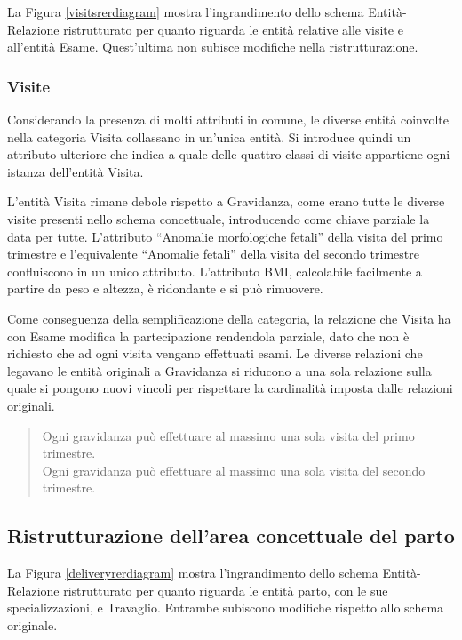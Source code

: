 La Figura \ref{visitsrerdiagram} mostra l'ingrandimento dello schema Entità-Relazione ristrutturato per quanto riguarda le entità relative alle visite e all'entità Esame.
Quest'ultima non subisce modifiche nella ristrutturazione.

\subsubsection{Visite}

Considerando la presenza di molti attributi in comune, le diverse entità coinvolte nella categoria Visita collassano in un'unica entità.
Si introduce quindi un attributo ulteriore che indica a quale delle quattro classi di visite appartiene ogni istanza dell'entità Visita.

L'entità Visita rimane debole rispetto a Gravidanza, come erano tutte le diverse visite presenti nello schema concettuale, introducendo come chiave parziale la data per tutte.
L'attributo \enquote{Anomalie morfologiche fetali} della visita del primo trimestre e l'equivalente \enquote{Anomalie fetali} della visita del secondo trimestre confluiscono in un unico attributo.
L'attributo BMI, calcolabile facilmente a partire da peso e altezza, è ridondante e si può rimuovere.

Come conseguenza della semplificazione della categoria, la relazione che Visita ha con Esame modifica la partecipazione rendendola parziale, dato che non è richiesto che ad ogni visita vengano effettuati esami.
Le diverse relazioni che legavano le entità originali a Gravidanza si riducono a una sola relazione sulla quale si pongono nuovi vincoli per rispettare la cardinalità imposta dalle relazioni originali.
\begin{quote}
Ogni gravidanza può effettuare al massimo una sola visita del primo trimestre. \\
Ogni gravidanza può effettuare al massimo una sola visita del secondo trimestre.
\end{quote}

\subsection{Ristrutturazione dell'area concettuale del parto}

La Figura \ref{deliveryrerdiagram} mostra l'ingrandimento dello schema Entità-Relazione ristrutturato per quanto riguarda le entità parto, con le sue specializzazioni, e Travaglio.
Entrambe subiscono modifiche rispetto allo schema originale.

